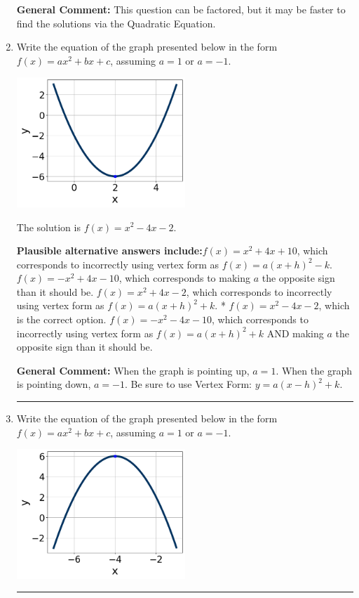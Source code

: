 \documentclass{extbook}[14pt]
\newcommand{\litem}[1]{\item #1

\rule{\textwidth}{0.4pt}}
\begin{document}
\begin{enumerate}
{\textbf{General Comment:} This question can be factored, but it may be faster to find the solutions via the Quadratic Equation.
}
\litem{
Write the equation of the graph presented below in the form $f(x)=ax^2+bx+c$, assuming  $a=1$ or $a=-1$.

\begin{center}
    \includegraphics[width=0.5\textwidth]{../Figures/quadraticGraphToEquationCopyC.png}
\end{center}


The solution is \( f(x) = x^{2} -4 x -2 \).\begin{enumerate}[label=\Alph*.]
\textbf{Plausible alternative answers include:}$f(x)=x^{2} +4 x + 10$, which corresponds to incorrectly using vertex form as $f(x) = a(x+h)^2 - k$.
$f(x)=-x^{2} +4 x -10$, which corresponds to making $a$ the opposite sign than it should be.
$f(x)=x^{2} +4 x -2$, which corresponds to incorrectly using vertex form as $f(x) = a(x+h)^2+k$.
* $f(x)=x^{2} -4 x -2$, which is the correct option.
$f(x)=-x^{2} -4 x -10$, which corresponds to incorrectly using vertex form as $f(x) = a(x+h)^2+k$ AND making $a$ the opposite sign than it should be.
\end{enumerate}

\textbf{General Comment:} When the graph is pointing up, $a=1$. When the graph is pointing down, $a=-1$. Be sure to use Vertex Form: $y = a(x-h)^2+k$.
}
\litem{
Write the equation of the graph presented below in the form $f(x)=ax^2+bx+c$, assuming  $a=1$ or $a=-1$.

\begin{center}
    \includegraphics[width=0.5\textwidth]{../Figures/quadraticGraphToEquationC.png}
\end{center}


}
\end{enumerate}
\end{document}
